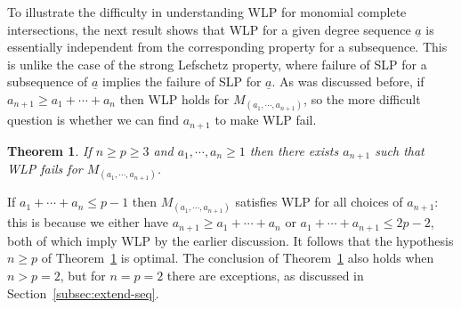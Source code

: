 \documentclass[11pt,reqno]{amsart}
\newcommand{\ul}[1]{\underline{#1}}
\newtheorem{theorem}{Theorem}[section]
\theoremstyle{definition}
\theoremstyle{remark}
\numberwithin{equation}{section}
\begin{document}
To illustrate the difficulty in understanding WLP for monomial complete intersections, the next result shows that WLP for a given degree sequence $\ul{a}$ is essentially independent from the corresponding property for a subsequence. This is unlike the case of the strong Lefschetz property, where failure of SLP for a  subsequence of $\ul{a}$ implies the failure of SLP for $\ul{a}$. As was discussed before, if $a_{n+1}\geq a_1+\cdots+a_n$ then WLP holds for $M_{(a_1,\cdots,a_{n+1})}$, so the more difficult question is whether we can find $a_{n+1}$ to make WLP fail. 

\begin{theorem}\label{thm:WLP-fail}
    If $n\geq p\geq 3$ and $a_1,\cdots,a_n\geq 1$ then there exists $a_{n+1}$ such that WLP fails for $M_{(a_1,\cdots,a_{n+1})}$.
\end{theorem}

If $a_1+\cdots+a_n\leq p-1$ then $M_{(a_1,\cdots,a_{n+1})}$ satisfies WLP for all choices of $a_{n+1}$: this is because we either have $a_{n+1}\geq a_1+\cdots+a_n$  or $a_1+\cdots+a_{n+1}\leq 2p-2$, both of which imply WLP by the earlier discussion. It follows that the hypothesis $n\geq p$ of Theorem~\ref{thm:WLP-fail} is optimal. The conclusion of Theorem~\ref{thm:WLP-fail} also holds when $n>p=2$, but for $n=p=2$ there are exceptions, as discussed in Section~\ref{subsec:extend-seq}.
\end{document}
